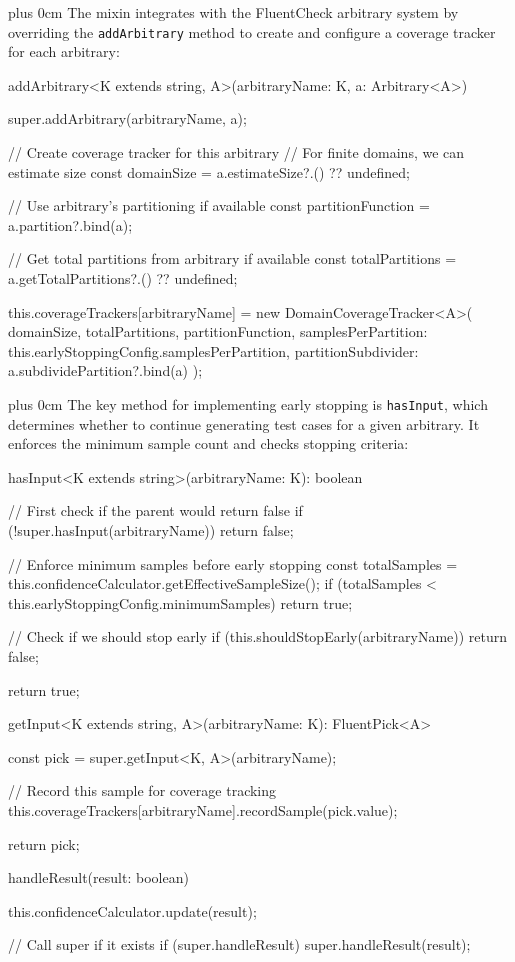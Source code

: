 \documentclass[conference]{IEEEtran}
\newcommand{\justifytext}{\leftskip=0pt \rightskip=0pt plus 0cm}
\begin{document}
\justifytext
The mixin integrates with the FluentCheck arbitrary system by overriding the \texttt{addArbitrary} method to create and configure a coverage tracker for each arbitrary:

\begin{wrappedcode}
    addArbitrary<K extends string, A>(arbitraryName: K, a: Arbitrary<A>) {
      super.addArbitrary(arbitraryName, a);
      
      // Create coverage tracker for this arbitrary
      // For finite domains, we can estimate size
      const domainSize = a.estimateSize?.() ?? undefined;
      
      // Use arbitrary's partitioning if available
      const partitionFunction = a.partition?.bind(a);
      
      // Get total partitions from arbitrary if available
      const totalPartitions = a.getTotalPartitions?.() ?? undefined;
      
      this.coverageTrackers[arbitraryName] = new DomainCoverageTracker<A>({
        domainSize,
        totalPartitions,
        partitionFunction,
        samplesPerPartition: this.earlyStoppingConfig.samplesPerPartition,
        partitionSubdivider: a.subdividePartition?.bind(a)
      });
    }
\end{wrappedcode}

\justifytext
The key method for implementing early stopping is \texttt{hasInput}, which determines whether to continue generating test cases for a given arbitrary. It enforces the minimum sample count and checks stopping criteria:

\begin{wrappedcode}
    hasInput<K extends string>(arbitraryName: K): boolean {
      // First check if the parent would return false
      if (!super.hasInput(arbitraryName)) {
        return false;
      }
      
      // Enforce minimum samples before early stopping
      const totalSamples = this.confidenceCalculator.getEffectiveSampleSize();
      if (totalSamples < this.earlyStoppingConfig.minimumSamples) {
        return true;
      }
      
      // Check if we should stop early
      if (this.shouldStopEarly(arbitraryName)) {
        return false;
      }
      
      return true;
    }
    
    getInput<K extends string, A>(arbitraryName: K): FluentPick<A> {
      const pick = super.getInput<K, A>(arbitraryName);
      
      // Record this sample for coverage tracking
      this.coverageTrackers[arbitraryName].recordSample(pick.value);
      
      return pick;
    }
    
    handleResult(result: boolean) {
      this.confidenceCalculator.update(result);
      
      // Call super if it exists
      if (super.handleResult) {
        super.handleResult(result);
      }
    }
\end{wrappedcode}
\end{document}
